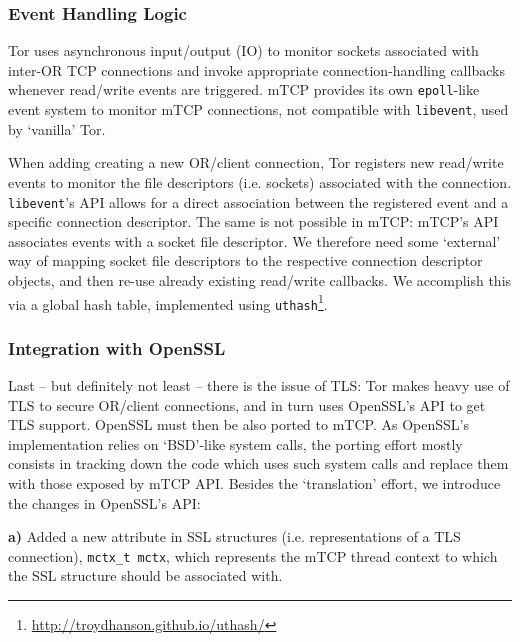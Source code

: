 
\subsubsection{Event Handling Logic}
\label{subsubsec:design-mtcp-event}

Tor uses asynchronous input\slash output (IO) to monitor sockets 
associated with inter-OR TCP connections and invoke appropriate connection-handling 
callbacks whenever read\slash write events are triggered. mTCP provides 
its own \verb+epoll+-like event system to monitor mTCP connections, not 
compatible with \verb+libevent+, used by `vanilla' Tor.

When adding creating a new OR\slash client connection, Tor registers new read\slash write 
events to monitor the file descriptors (i.e. sockets) associated with the 
connection. \verb+libevent+'s API allows 
for a direct association between the registered event and a 
specific connection descriptor. The same is not possible in mTCP: mTCP's API 
associates events with a socket file descriptor. We 
therefore need some `external' way of mapping socket file descriptors to the 
respective connection descriptor objects, and then re-use already existing 
read\slash write callbacks. We accomplish this via a global hash 
table, implemented 
using \verb+uthash+\footnote{\url{http://troydhanson.github.io/uthash/}}.

\subsubsection{Integration with OpenSSL}
\label{subsubsec:design-mtcp-openssl}

Last -- but definitely not least -- there is the issue of TLS: Tor 
makes heavy use of TLS to secure OR\slash client connections, and in turn uses 
OpenSSL's API to get TLS support. OpenSSL must then be also ported to mTCP. 
As OpenSSL's implementation relies on `BSD'-like system calls, the porting 
effort mostly consists in tracking down the code which uses such system calls 
and replace them with those exposed by mTCP API. Besides the `translation' effort, 
we introduce the changes in OpenSSL's API:

\textbf{a)} Added a new attribute in SSL structures (i.e. representations of a TLS 
connection), \verb+mctx_t mctx+, which represents the mTCP thread context to 
which the SSL structure should be associated with.


